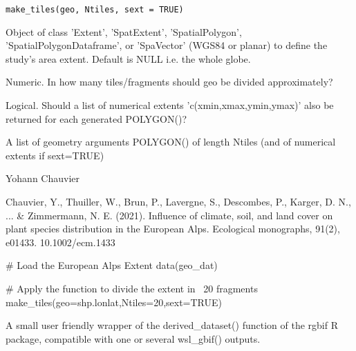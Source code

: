 \documentclass[a4paper]{book}
\begin{document}
%
\begin{Usage}
\begin{verbatim}
make_tiles(geo, Ntiles, sext = TRUE)
\end{verbatim}
\end{Usage}
%
\begin{Arguments}
\begin{ldescription}
\item[\code{geo}] Object of class 'Extent', 'SpatExtent', 'SpatialPolygon', 'SpatialPolygonDataframe',
or 'SpaVector' (WGS84 or planar) to define the study's area extent. Default is NULL i.e. the
whole globe.

\item[\code{Ntiles}] Numeric. In how many tiles/fragments should geo be divided approximately?

\item[\code{sext}] Logical. Should a list of numerical extents 'c(xmin,xmax,ymin,ymax)' also be returned
for each generated POLYGON()?
\end{ldescription}
\end{Arguments}
%
\begin{Value}
A list of geometry arguments POLYGON() of length Ntiles (and of numerical extents
if sext=TRUE)
\end{Value}
%
\begin{Author}\relax
Yohann Chauvier
\end{Author}
%
\begin{References}\relax
Chauvier, Y., Thuiller, W., Brun, P., Lavergne, S., Descombes, P., Karger, D. N., ... \& Zimmermann,
N. E. (2021). Influence of climate, soil, and land cover on plant species distribution in the
European Alps. Ecological monographs, 91(2), e01433. 10.1002/ecm.1433
\end{References}
%
\begin{Examples}
\begin{ExampleCode}

# Load the European Alps Extent
data(geo_dat)

# Apply the function to divide the extent in ~20 fragments
make_tiles(geo=shp.lonlat,Ntiles=20,sext=TRUE)

\end{ExampleCode}
\end{Examples}
%
\begin{Description}\relax
A small user friendly wrapper of the derived\_dataset() function of the
rgbif R package, compatible with one or several wsl\_gbif() outputs.
\end{Description}
\end{document}
